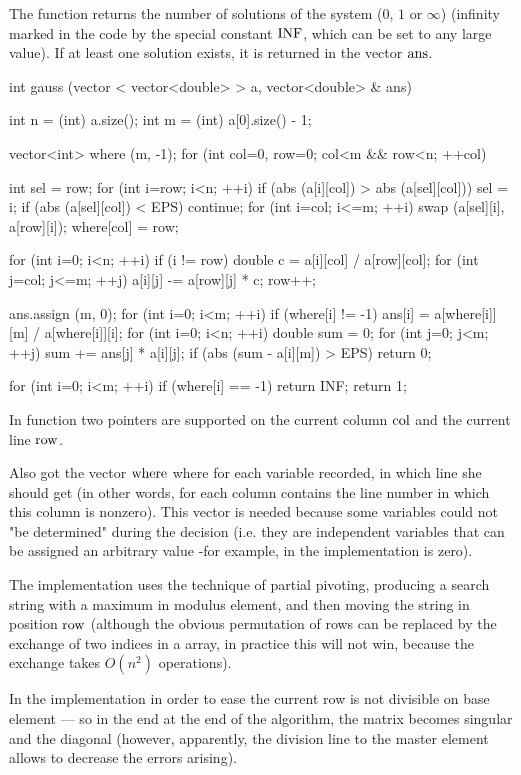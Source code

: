 The function returns the number of solutions of the system ($0$, $1$ or $\infty$) (infinity marked in the code by the special constant $\rm INF$, which can be set to any large value). If at least one solution exists, it is returned in the vector $\rm ans$.

\code
int gauss (vector < vector<double> > a, vector<double> & ans) {
int n = (int) a.size();
int m = (int) a[0].size() - 1;

vector<int> where (m, -1);
for (int col=0, row=0; col<m && row<n; ++col) {
int sel = row;
for (int i=row; i<n; ++i)
if (abs (a[i][col]) > abs (a[sel][col]))
sel = i;
if (abs (a[sel][col]) < EPS)
continue;
for (int i=col; i<=m; ++i)
swap (a[sel][i], a[row][i]);
where[col] = row;

for (int i=0; i<n; ++i)
if (i != row) {
double c = a[i][col] / a[row][col];
for (int j=col; j<=m; ++j)
a[i][j] -= a[row][j] * c;
}
row++;
}

ans.assign (m, 0);
for (int i=0; i<m; ++i)
if (where[i] != -1)
ans[i] = a[where[i]][m] / a[where[i]][i];
for (int i=0; i<n; ++i) {
double sum = 0;
for (int j=0; j<m; ++j)
sum += ans[j] * a[i][j];
if (abs (sum - a[i][m]) > EPS)
return 0;
}

for (int i=0; i<m; ++i)
if (where[i] == -1)
return INF;
return 1;
}
\endcode

In function two pointers are supported on the current column $\rm col$ and the current line $\rm row$.

Also got the vector $\rm where$ where for each variable recorded, in which line she should get (in other words, for each column contains the line number in which this column is nonzero). This vector is needed because some variables could not "be determined" during the decision (i.e. they are independent variables that can be assigned an arbitrary value -for example, in the implementation is zero).

The implementation uses the technique of partial pivoting, producing a search string with a maximum in modulus element, and then moving the string in position $\rm row$ (although the obvious permutation of rows can be replaced by the exchange of two indices in a array, in practice this will not win, because the exchange takes $O(n^2)$ operations).

In the implementation in order to ease the current row is not divisible on base element --- so in the end at the end of the algorithm, the matrix becomes singular and the diagonal (however, apparently, the division line to the master element allows to decrease the errors arising).

